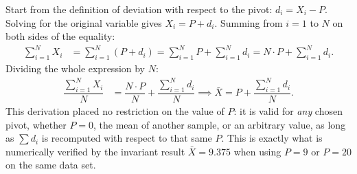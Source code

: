 \begin{solproblema}[prob:08f4f21]
	Start from the definition of deviation with respect to the pivot: $d_{i} = X_{i} - P$. Solving for the original variable gives $X_{i} = P + d_{i}$. Summing from $i=1$ to $N$ on both sides of the equality:
	\begin{align}
		\sum_{i=1}^{N} X_{i} &= \sum_{i=1}^{N} (P + d_{i}) = \sum_{i=1}^{N} P + \sum_{i=1}^{N} d_{i} = N \cdot P + \sum_{i=1}^{N} d_{i}.
	\end{align}
	Dividing the whole expression by $N$:
	\begin{align}
		\dfrac{\sum_{i=1}^{N} X_{i}}{N} &= \dfrac{N \cdot P}{N} + \dfrac{\sum_{i=1}^{N} d_{i}}{N} \implies \bar{X} = P + \dfrac{\sum_{i=1}^{N} d_{i}}{N}.
	\end{align}
	This derivation placed no restriction on the value of $P$: it is valid for \emph{any} chosen pivot, whether $P=0$, the mean of another sample, or an arbitrary value, as long as $\sum d_i$ is recomputed with respect to that same $P$. This is exactly what is numerically verified by the invariant result $\bar{X}=9.375$ when using $P=9$ or $P=20$ on the same data set.
\end{solproblema}

